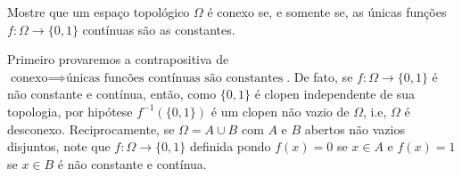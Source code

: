 \begin{Mybox}
Mostre que um espaço topológico $\Omega$ é conexo se, e somente se, as únicas funções $f: \Omega \to \{0, 1 \}$ contínuas são as constantes.
\vspace{-.4cm}
\end{Mybox}
\vspace{-.5cm}
\begin{dem}
Primeiro provaremos a contrapositiva de $\text{conexo} \implies  \text{únicas funcões contínuas são constantes}$. De fato, se $f: \Omega \to \{0, 1\}$ é não constante e contínua, então, como $\{0, 1 \}$ é clopen independente de sua topologia, por hipótese $f^{-1}(\{0, 1\})$ é um clopen não vazio de $\Omega$, i.e, $\Omega$ é desconexo. Reciprocamente, se $\Omega = A \cup B$ com $A$ e $B$ abertos não vazios disjuntos, note que $f: \Omega \to \{0, 1\}$ definida pondo $f(x) = 0$ se $x \in A$ e $f(x) = 1$ se $x \in B$ é não constante e contínua. 
\end{dem}

